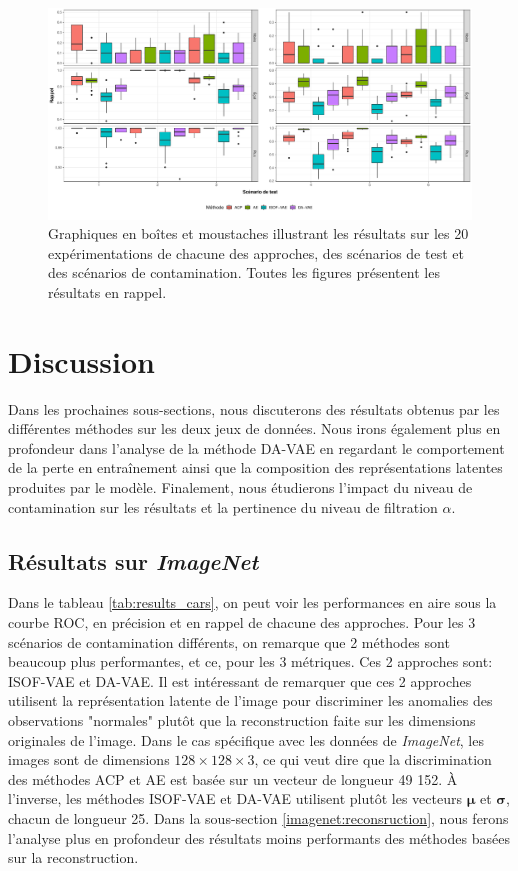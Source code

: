 \begin{figure}[H]
	\centering
	\includegraphics[width=\linewidth]{images/images_boxplots/recall_mnist.pdf}
	\caption{Graphiques en boîtes et moustaches illustrant les résultats sur les 20 expérimentations de chacune des approches, des scénarios de test et des scénarios de contamination. Toutes les figures présentent les résultats en rappel.}
	\label{fig:recall_mnist}
\end{figure}

\section{Discussion} \label{discussion}

Dans les prochaines sous-sections, nous discuterons des résultats obtenus par les différentes méthodes sur les deux jeux de données. Nous irons également plus en profondeur dans l'analyse de la méthode DA-VAE en regardant le comportement de la perte en entraînement ainsi que la composition des représentations latentes produites par le modèle. Finalement, nous étudierons l'impact du niveau de contamination sur les résultats et la pertinence du niveau de filtration $\alpha$.

\subsection{Résultats sur \textit{ImageNet}} \label{imagenet_results}

Dans le tableau \ref{tab:results_cars}, on peut voir les performances en aire sous la courbe ROC, en précision et en rappel de chacune des approches. Pour les 3 scénarios de contamination différents, on remarque que 2 méthodes sont beaucoup plus performantes, et ce, pour les 3 métriques. Ces 2 approches sont: ISOF-VAE et DA-VAE. Il est intéressant de remarquer que ces 2 approches utilisent la représentation latente de l'image pour discriminer les anomalies des observations "normales" plutôt que la reconstruction faite sur les dimensions originales de l'image. Dans le cas spécifique avec les données de \textit{ImageNet}, les images sont de dimensions $128 \times 128 \times 3$, ce qui veut dire que la discrimination des méthodes ACP et AE est basée sur un vecteur de longueur 49 152. À l'inverse, les méthodes ISOF-VAE et DA-VAE utilisent plutôt les vecteurs $\mathbf{\mu}$ et $\mathbf{\sigma}$, chacun de longueur 25. Dans la sous-section \ref{imagenet:reconsruction}, nous ferons l'analyse plus en profondeur des résultats moins performants des méthodes basées sur la reconstruction.

